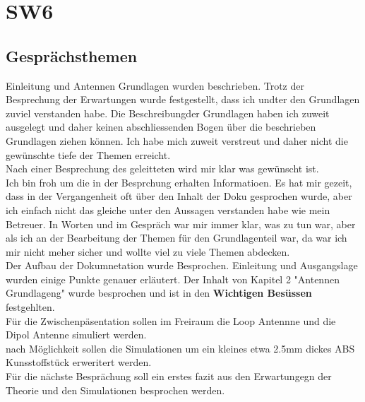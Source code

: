 \documentclass[10pt,a4paper]{article}
\begin{document}
\section*{SW6}

\subsection*{Gesprächsthemen}

Einleitung und Antennen Grundlagen wurden beschrieben. Trotz der Besprechung der Erwartungen wurde festgestellt, dass ich undter den Grundlagen  zuviel verstanden habe. Die Beschreibungder Grundlagen haben ich zuweit ausgelegt und daher keinen abschliessenden Bogen über die beschrieben Grundlagen ziehen können. Ich habe mich zuweit verstreut und daher nicht die gewünschte tiefe der Themen erreicht.\\ Nach einer Besprechung des geleitteten wird mir klar was  gewünscht ist.\\
Ich bin froh um die in der Besprchung  erhalten Informatioen.
Es hat mir gezeit, dass in der Vergangenheit oft über den Inhalt der Doku gesprochen wurde, aber ich einfach nicht das gleiche unter den Aussagen verstanden habe wie mein Betreuer. In Worten und im Gespräch war mir immer klar, was zu tun war, aber als ich an der Bearbeitung der Themen für den Grundlagenteil war, da war ich mir  nicht meher sicher und wollte viel zu viele Themen abdecken.  \\
Der Aufbau der Dokumnetation wurde Besprochen. Einleitung und Ausgangslage wurden einige Punkte genauer erläutert. Der Inhalt von Kapitel 2 "Antennen Grundlageng" wurde besprochen und ist in den \textbf{ Wichtigen Besüssen} festgehlten. \\
Für die Zwischenpäsentation sollen im Freiraum die Loop Antennne und die Dipol Antenne simuliert werden. \\
nach Möglichkeit sollen die Simulationen um ein kleines etwa 2.5mm dickes ABS Kunsstoffstück erweritert werden.\\
Für die nächste Besprächung soll ein erstes fazit aus den Erwartungegn der Theorie und den Simulationen besprochen werden.
\end{document}

